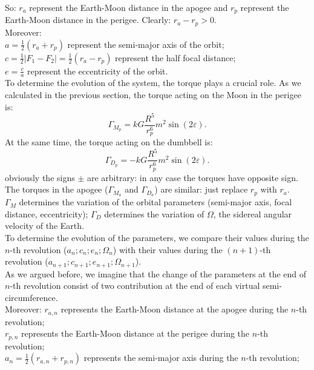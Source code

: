 \documentclass[11pt, oneside,reqno]{amsart}
\begin{document}
So: $r_a$ represent the Earth-Moon distance in the apogee and $r_p$ represent the Earth-Moon distance in the perigee. 
Clearly: $r_a - r_p > 0$.\\
Moreover:\\
$a = \frac{1}{2} (r_a + r_p)$ represent the semi-major axis of the orbit;\\
$c = \frac{1}{2}|F_1-F_2| = \frac{1}{2}(r_a - r_p)$ represent the half focal distance;\\
$e = \frac{c}{a}$ represent the eccentricity of the orbit.\\
To determine the evolution of the system, the torque plays a crucial role. As we calculated in the previous section, the torque acting on the Moon in the perigee is:
\begin{equation} \label{eq.moontorque}
    \Gamma_{M_p} = k G \frac{R^5}{r_p^6} m^2 \sin(2\varepsilon).
\end{equation}
At the same time, the torque acting on the dumbbell is: 
\begin{equation} \label{eq.dumbbelltorque}
    \Gamma_{D_p} = -k G \frac{R^5}{r_p^6} m^2 \sin(2\varepsilon).
\end{equation}
obviously the signs $\pm$ are arbitrary: in any case the torques have opposite sign.\\
The torques in the apogee ($\Gamma_{M_a}$ and $\Gamma_{D_a}$) are similar: just replace $r_p$ with $r_a$.\\
$\Gamma_M$ determines the variation of the orbital parameters (semi-major axis, focal distance, eccentricity); $\Gamma_D$ determines the variation of $\Omega$, the sidereal angular velocity of the Earth.\\
To determine the evolution of the parameters, we compare their values 
during the $n$-th revolution ($a_n; c_n; e_n; \Omega_n$) with their values during the $(n+1)$-th revolution ($a_{n+1}; c_{n+1}; e_{n+1}; \Omega_{n+1}$).\\
As we argued before, we imagine that the change of the parameters at the end of $n$-th revolution consist of two contribution at the end of each virtual semi-circumference.\\ 
Moreover: $r_{a,n}$ represents the Earth-Moon distance at the apogee during the $n$-th revolution;\\
$r_{p,n}$ represents the Earth-Moon distance at the perigee during the $n$-th revolution;\\
$a_n=\frac{1}{2}(r_{a,n}+r_{p,n})$ represents the semi-major axis during the $n$-th revolution;\\
\end{document}
